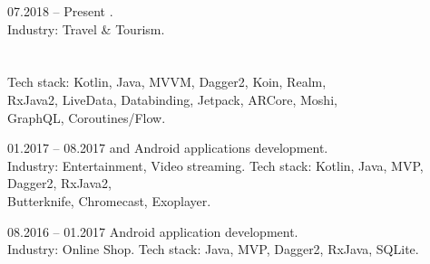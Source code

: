 \documentclass[12pt, a4paper]{article}
\newcommand{\subSectionSpace}{12pt}
\newcommand{\sectionSpace}{16pt}
\begin{document}
\begin{minipage}[t]{0.6\textwidth}
    
    \vspace{\sectionSpace}
    
    \begin{subsec}{}{07.2018 – Present}
        \>  .   \\
        \>  Industry: Travel \& Tourism.                             \lineend
        \>          \\
        \>        \\
        \>             \\
        \>                \lineend
        \>  Tech stack: Kotlin, Java, MVVM,  Dagger2, Koin, Realm,   \\
        \>  RxJava2, LiveData, Databinding, Jetpack, ARCore, Moshi,  \\
        \>  GraphQL, Coroutines/Flow.                                \\
    \end{subsec}
    
    \vspace{\subSectionSpace}
    
    \begin{subsec}{}{01.2017 – 08.2017}
        \>   and  Android applications development.   \\
        \>  Industry: Entertainment, Video streaming.               \lineend
        \>  Tech stack: Kotlin, Java, MVP, Dagger2, RxJava2,                                        \\
        \>  Butterknife, Chromecast, Exoplayer.                                                     \\
    \end{subsec}
    
    \vspace{\subSectionSpace}
    
    \begin{subsec}{}{08.2016 – 01.2017}
        \>   Android application development.    \\
        \>  Industry: Online Shop.                                      \lineend
        \>  Tech stack: Java, MVP, Dagger2, RxJava, SQLite.             \\
    \end{subsec}


\end{minipage}
\end{document}
